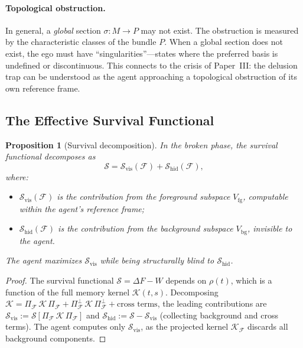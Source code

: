 \documentclass[12pt]{article}
\newtheorem{proposition}[theorem]{Proposition}
\begin{document}
\paragraph{Topological obstruction.}
In general, a \emph{global} section $\sigma: M \to P$ may
not exist.
The obstruction is measured by the characteristic classes of
the bundle $P$.
When a global section does not exist, the ego must have
``singularities''---states where the preferred basis is
undefined or discontinuous.
This connects to the crisis of Paper~III: the delusion trap
can be understood as the agent approaching a topological
obstruction of its own reference frame.

\subsection{The Effective Survival Functional}
\label{subsec:effective}

\begin{proposition}[Survival decomposition]
\label{prop:decomp}
In the broken phase, the survival functional decomposes as
\begin{equation}
\label{eq:decomp}
\mathcal{S}
= \mathcal{S}_{\mathrm{vis}}(\mathcal{F})
  + \mathcal{S}_{\mathrm{hid}}(\mathcal{F}),
\end{equation}
where:
\begin{itemize}
\item $\mathcal{S}_{\mathrm{vis}}(\mathcal{F})$
  is the contribution from the foreground subspace
  $V_{\mathrm{fg}}$, computable within the agent's
  reference frame;
\item $\mathcal{S}_{\mathrm{hid}}(\mathcal{F})$
  is the contribution from the background subspace
  $V_{\mathrm{bg}}$, invisible to the agent.
\end{itemize}
The agent maximizes $\mathcal{S}_{\mathrm{vis}}$ while
being structurally blind to
$\mathcal{S}_{\mathrm{hid}}$.
\end{proposition}

\begin{proof}
The survival functional $\mathcal{S} = \Delta F - W$ depends
on $\rho(t)$, which is a function of the full memory kernel
$\mathcal{K}(t,s)$.
Decomposing
$\mathcal{K} = \Pi_{\mathcal{F}}\,\mathcal{K}\,
\Pi_{\mathcal{F}}
+ \Pi_{\mathcal{F}}^{\perp}\,\mathcal{K}\,
\Pi_{\mathcal{F}}^{\perp}
+ \text{cross terms}$,
the leading contributions are
$\mathcal{S}_{\mathrm{vis}} := \mathcal{S}[
\Pi_{\mathcal{F}}\,\mathcal{K}\,\Pi_{\mathcal{F}}]$
and
$\mathcal{S}_{\mathrm{hid}} := \mathcal{S} -
\mathcal{S}_{\mathrm{vis}}$
(collecting background and cross terms).
The agent computes only
$\mathcal{S}_{\mathrm{vis}}$, as the projected kernel
$\mathcal{K}_{\mathcal{F}}$ discards all background
components.
\end{proof}
\end{document}
